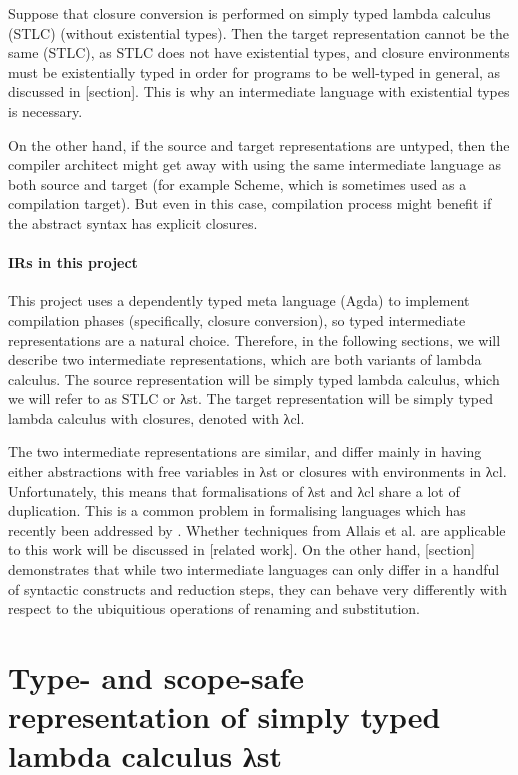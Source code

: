 \documentclass[bsc,frontabs,oneside,singlespacing,parskip,deptreport]{infthesis}
\theoremstyle{definition}
\begin{document}
Suppose that closure conversion is performed on simply typed lambda
calculus (STLC) (without existential types). Then the target representation
cannot be the same (STLC), as STLC does not have existential types,
and closure environments must be existentially typed in order for
programs to be well-typed in general, as discussed in [section]. This
is why an intermediate language with existential types is necessary.

On the other hand, if the source and target representations are
untyped, then the compiler architect might get away with using the
same intermediate language as both source and target (for example
Scheme, which is sometimes used as a compilation target). But even
in this case, compilation process might benefit if the abstract syntax
has explicit closures.

\paragraph{IRs in this project} This project uses a dependently typed
meta language (Agda) to implement compilation phases (specifically,
closure conversion), so typed intermediate representations are a
natural choice. Therefore, in the following sections, we will describe
two intermediate representations, which are both variants of lambda
calculus. The source representation will be simply typed lambda
calculus, which we will refer to as STLC or λst. The target
representation will be simply typed lambda calculus with closures,
denoted with λcl.

The two intermediate representations are similar, and differ mainly in
having either abstractions with free variables in λst or closures with
environments in λcl. Unfortunately, this means that formalisations of
λst and λcl share a lot of duplication. This is a common problem in
formalising languages which has recently been addressed by
\cite{DBLP:journals/pacmpl/AllaisA0MM18}. Whether techniques from
Allais et al. are applicable to this work will be discussed in [related
work]. On the other hand, [section] demonstrates that while two
intermediate languages can only differ in a handful of syntactic
constructs and reduction steps, they can behave very differently with
respect to the ubiquitious operations of renaming and substitution.

\section{Type- and scope-safe representation of simply typed lambda
  calculus λst}
\end{document}
